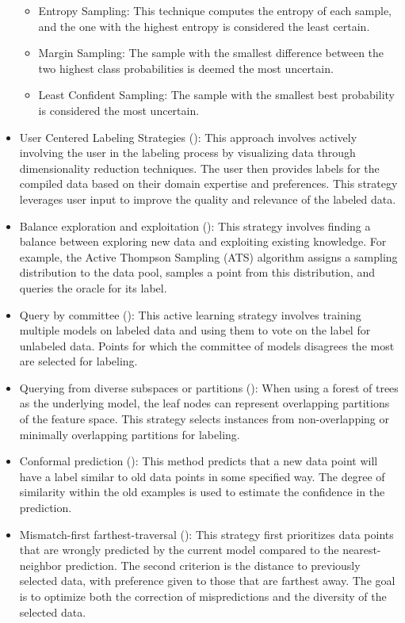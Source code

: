 \documentclass[
  letterpaper,
  DIV=11,
  numbers=noendperiod,
  oneside]{scrreprt}
\theoremstyle{remark}
\begin{document}
\begin{itemize}
  \begin{itemize}
  \item
    Entropy Sampling: This technique computes the entropy of each
    sample, and the one with the highest entropy is considered the least
    certain.
  \item
    Margin Sampling: The sample with the smallest difference between the
    two highest class probabilities is deemed the most uncertain.
  \item
    Least Confident Sampling: The sample with the smallest best
    probability is considered the most uncertain.
  \end{itemize}
\item
  User Centered Labeling Strategies
  (): This approach
  involves actively involving the user in the labeling process by
  visualizing data through dimensionality reduction techniques. The user
  then provides labels for the compiled data based on their domain
  expertise and preferences. This strategy leverages user input to
  improve the quality and relevance of the labeled data.
\item
  Balance exploration and exploitation
  (): This
  strategy involves finding a balance between exploring new data and
  exploiting existing knowledge. For example, the Active Thompson
  Sampling (ATS) algorithm assigns a sampling distribution to the data
  pool, samples a point from this distribution, and queries the oracle
  for its label.
\item
  Query by committee ():
  This active learning strategy involves training multiple models on
  labeled data and using them to vote on the label for unlabeled data.
  Points for which the committee of models disagrees the most are
  selected for labeling.
\item
  Querying from diverse subspaces or partitions
  (): When using a forest of
  trees as the underlying model, the leaf nodes can represent
  overlapping partitions of the feature space. This strategy selects
  instances from non-overlapping or minimally overlapping partitions for
  labeling.
\item
  Conformal prediction (): This method predicts that a new data point will
  have a label similar to old data points in some specified way. The
  degree of similarity within the old examples is used to estimate the
  confidence in the prediction.
\item
  Mismatch-first farthest-traversal (): This strategy first prioritizes data
  points that are wrongly predicted by the current model compared to the
  nearest-neighbor prediction. The second criterion is the distance to
  previously selected data, with preference given to those that are
  farthest away. The goal is to optimize both the correction of
  mispredictions and the diversity of the selected data.
\end{itemize}
\end{document}
